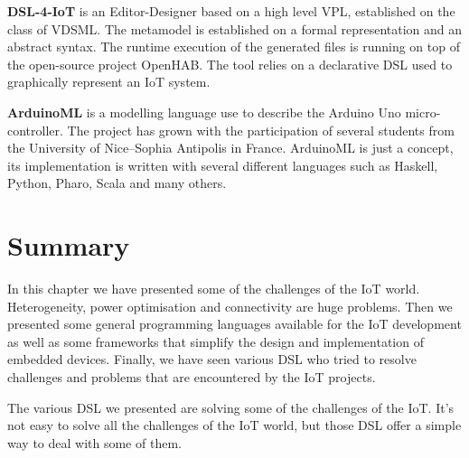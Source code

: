 \textbf{DSL-4-IoT} is an Editor-Designer based on a high level \gls{VPL},
established on the class of \gls{VDSML}\cite{Salihbegovic2015}. The metamodel is
established on a formal representation and an abstract syntax. The runtime execution of
the generated files is running on top of the open-source project
OpenHAB\cite{eichstadt2015openhab}. The tool relies on a declarative \gls{DSL}
used to graphically represent an \gls{IoT} system.

\textbf{ArduinoML} is a modelling language use to describe the Arduino Uno
micro-controller\cite{Mosser2014}. The project has grown with the participation
of several students from the University of Nice–Sophia Antipolis in France.
ArduinoML is just a concept, its implementation is written with several
different languages such as Haskell, Python, Pharo, Scala and many
others\cite{Mooser2017}.

\section{Summary}
\label{sec:iot_dev_summary}

In this chapter we have presented some of the challenges of the \gls{IoT} world.
Heterogeneity, power optimisation and connectivity are huge problems. Then we
presented some general programming languages available for the \gls{IoT}
development as well as some frameworks that simplify the design and
implementation of embedded devices. Finally, we have seen various \gls{DSL} who
tried to resolve challenges and problems that are encountered by the \gls{IoT}
projects.

The various \gls{DSL} we presented are solving some of the challenges of the
\gls{IoT}. It's not easy to solve all the challenges of the \gls{IoT} world, but
those \gls{DSL} offer a simple way to deal with some of them.

